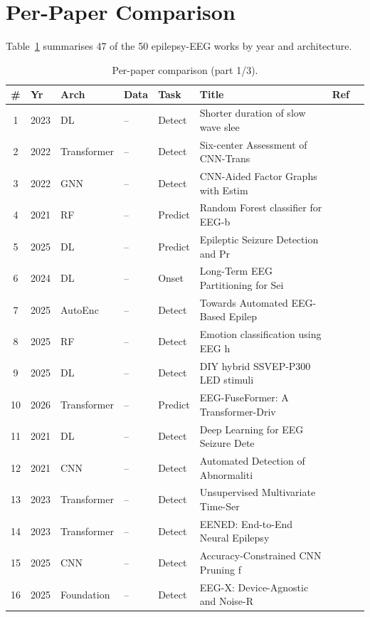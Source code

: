 \documentclass[10pt,journal,twocolumn]{IEEEtran}
\begin{document}
\section{Per-Paper Comparison}
Table~\ref{tab:perpaper} summarises 47 of the 50 epilepsy-EEG works by year and architecture.
\begin{table}[t]\centering\caption{Per-paper comparison (part 1/3).}\label{tab:perpaper}
\footnotesize\begin{tabular}{clllll p{2.4cm}l}\toprule \# & Yr & Arch & Data & Task & Title & Ref\\\midrule
1 & 2023 & DL & -- & Detect & Shorter duration of slow wave slee & \cite{ep231101280} \\
2 & 2022 & Transformer & -- & Detect & Six-center Assessment of CNN-Trans & \cite{ep220800025} \\
3 & 2022 & GNN & -- & Detect & CNN-Aided Factor Graphs with Estim & \cite{ep220305950} \\
4 & 2021 & RF & -- & Predict & Random Forest classifier for EEG-b & \cite{ep210604510} \\
5 & 2025 & DL & -- & Predict & Epileptic Seizure Detection and Pr & \cite{ep251024986} \\
6 & 2024 & DL & -- & Onset & Long-Term EEG Partitioning for Sei & \cite{ep241215598} \\
7 & 2025 & AutoEnc & -- & Detect & Towards Automated EEG-Based Epilep & \cite{ep250820535} \\
8 & 2025 & RF & -- & Detect & Emotion classification using EEG h & \cite{ep251222333} \\
9 & 2025 & DL & -- & Detect & DIY hybrid SSVEP-P300 LED stimuli  & \cite{ep250801510} \\
10 & 2026 & Transformer & -- & Predict & EEG-FuseFormer: A Transformer-Driv & \cite{ep260602166} \\
11 & 2021 & DL & -- & Detect & Deep Learning for EEG Seizure Dete & \cite{ep210600611} \\
12 & 2021 & CNN & -- & Detect & Automated Detection of Abnormaliti & \cite{ep210510358} \\
13 & 2023 & Transformer & -- & Detect & Unsupervised Multivariate Time-Ser & \cite{ep230103470} \\
14 & 2023 & Transformer & -- & Detect & EENED: End-to-End Neural Epilepsy  & \cite{ep230510502} \\
15 & 2025 & CNN & -- & Detect & Accuracy-Constrained CNN Pruning f & \cite{ep250905190} \\
16 & 2025 & Foundation & -- & Detect & EEG-X: Device-Agnostic and Noise-R & \cite{ep251108861} \\
\bottomrule\end{tabular}\end{table}
\end{document}
